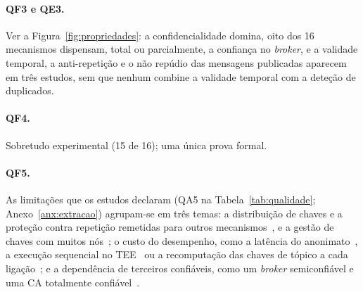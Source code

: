 \paragraph{QF3 e QE3.} Ver a Figura~\ref{fig:propriedades}: a confidencialidade
domina, oito dos 16 mecanismos dispensam, total ou parcialmente, a confiança no
\emph{broker}, e a validade temporal, a anti-repetição e o não repúdio das mensagens
publicadas aparecem em três estudos, sem que nenhum combine a validade temporal com
a deteção de duplicados.

\paragraph{QF4.} Sobretudo experimental (15 de 16); uma única prova formal.

\paragraph{QF5.} As limitações que os estudos declaram (QA5 na
Tabela~\ref{tab:qualidade}; Anexo~\ref{anx:extracao}) agrupam-se em três temas: a
distribuição de chaves e a proteção contra repetição remetidas para outros
mecanismos~\cite[§6]{dinculeana2019vulnerabilities}, e a gestão de chaves com
muitos nós~\cite[§V]{sadio2019lightweight}; o custo do desempenho, como a latência do
anonimato~\cite{buccafurri2023mqtta}, a execução sequencial no
TEE~\cite{segarra2020mqttz} ou a recomputação das chaves de tópico a cada
ligação~\cite{vanglabbeek2022flexible}; e a dependência de terceiros confiáveis,
como um \emph{broker} semiconfiável e uma CA totalmente
confiável~\cite{vanglabbeek2022flexible}.
